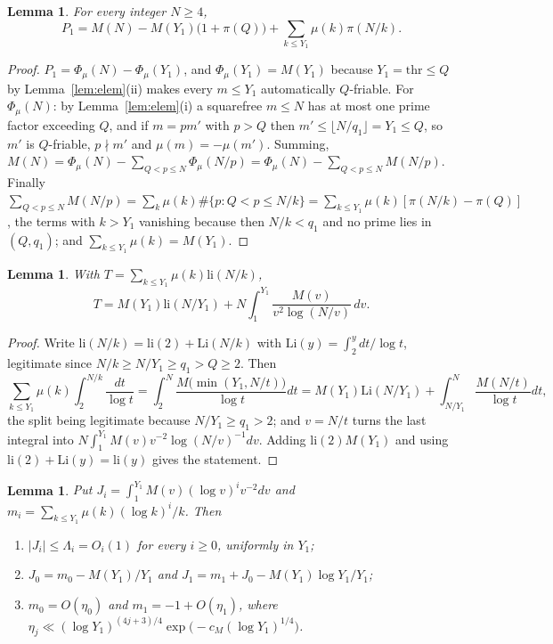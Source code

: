 \documentclass[11pt,a4paper]{article}
\theoremstyle{plain}
\newtheorem{lemma}[theorem]{Lemma}
\theoremstyle{definition}
\theoremstyle{remark}
\newcommand{\thr}{\mathrm{thr}}
\newcommand{\li}{\mathrm{li}}
\newcommand{\Li}{\mathrm{Li}}
\begin{document}
\begin{lemma}\label{lem:identity}
For every integer $N\ge4$,
\[
  P_{1}=M(N)-M(Y_{1})\bigl(1+\pi(Q)\bigr)+\sum_{k\le Y_{1}}\mu(k)\pi(N/k).
\]
\end{lemma}

\begin{proof}
$P_{1}=\Phi_{\mu}(N)-\Phi_{\mu}(Y_{1})$, and $\Phi_{\mu}(Y_{1})=M(Y_{1})$ because $Y_{1}=\thr\le Q$ by
Lemma~\ref{lem:elem}(ii) makes every $m\le Y_{1}$ automatically $Q$-friable. For $\Phi_{\mu}(N)$: by
Lemma~\ref{lem:elem}(i) a squarefree $m\le N$ has at most one prime factor exceeding $Q$, and if $m=pm'$
with $p>Q$ then $m'\le\lfloor N/q_{1}\rfloor=Y_{1}\le Q$, so $m'$ is $Q$-friable, $p\nmid m'$ and
$\mu(m)=-\mu(m')$. Summing,
$M(N)=\Phi_{\mu}(N)-\sum_{Q<p\le N}\Phi_{\mu}(N/p)=\Phi_{\mu}(N)-\sum_{Q<p\le N}M(N/p)$. Finally
$\sum_{Q<p\le N}M(N/p)=\sum_{k}\mu(k)\#\{p:Q<p\le N/k\}=\sum_{k\le Y_{1}}\mu(k)[\pi(N/k)-\pi(Q)]$, the
terms with $k>Y_{1}$ vanishing because then $N/k<q_{1}$ and no prime lies in $(Q,q_{1})$; and
$\sum_{k\le Y_{1}}\mu(k)=M(Y_{1})$.
\end{proof}

\begin{lemma}\label{lem:transform}
With $T=\sum_{k\le Y_{1}}\mu(k)\li(N/k)$,
\[
  T=M(Y_{1})\li(N/Y_{1})+N\int_{1}^{Y_{1}}\frac{M(v)}{v^{2}\log(N/v)}\,dv .
\]
\end{lemma}

\begin{proof}
Write $\li(N/k)=\li(2)+\Li(N/k)$ with $\Li(y)=\int_{2}^{y}dt/\log t$, legitimate since
$N/k\ge N/Y_{1}\ge q_{1}>Q\ge2$. Then
\[
  \sum_{k\le Y_{1}}\mu(k)\int_{2}^{N/k}\frac{dt}{\log t}
  =\int_{2}^{N}\frac{M\bigl(\min(Y_{1},N/t)\bigr)}{\log t}dt
  =M(Y_{1})\Li(N/Y_{1})+\int_{N/Y_{1}}^{N}\frac{M(N/t)}{\log t}dt,
\]
the split being legitimate because $N/Y_{1}\ge q_{1}>2$; and $v=N/t$ turns the last integral into
$N\int_{1}^{Y_{1}}M(v)v^{-2}\log(N/v)^{-1}dv$. Adding $\li(2)M(Y_{1})$ and using $\li(2)+\Li(y)=\li(y)$
gives the statement.
\end{proof}

\begin{lemma}\label{lem:moments}
Put $J_{i}=\int_{1}^{Y_{1}}M(v)(\log v)^{i}v^{-2}dv$ and
$m_{i}=\sum_{k\le Y_{1}}\mu(k)(\log k)^{i}/k$. Then
\begin{enumerate}
\item[(i)] $|J_{i}|\le\Lambda_{i}=O_{i}(1)$ for every $i\ge0$, uniformly in $Y_{1}$;
\item[(ii)] $J_{0}=m_{0}-M(Y_{1})/Y_{1}$ and $J_{1}=m_{1}+J_{0}-M(Y_{1})\log Y_{1}/Y_{1}$;
\item[(iii)] $m_{0}=O(\eta_{0})$ and $m_{1}=-1+O(\eta_{1})$, where
$\eta_{j}\ll(\log Y_{1})^{(4j+3)/4}\exp\bigl(-c_{M}(\log Y_{1})^{1/4}\bigr)$.
\end{enumerate}
\end{lemma}
\end{document}
